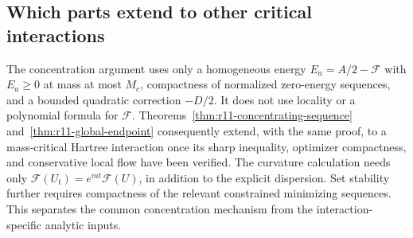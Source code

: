 \subsection{Which parts extend to other critical interactions}

The concentration argument uses only a homogeneous energy
$E_a=A/2-\mathcal F$ with $E_a\ge0$ at mass at most $M_c$,
compactness of normalized zero-energy sequences, and a bounded
quadratic correction $-D/2$.  It does not use locality or a polynomial
formula for $\mathcal F$.  Theorems~\ref{thm:r11-concentrating-sequence}
and~\ref{thm:r11-global-endpoint} consequently extend, with the same
proof, to a mass-critical Hartree interaction once its sharp inequality,
optimizer compactness, and conservative local flow have been verified.
The curvature calculation needs only
$\mathcal F(U_t)=e^{mt}\mathcal F(U)$, in addition to the explicit
dispersion.  Set stability further requires compactness of the relevant
constrained minimizing sequences.  This separates the common
concentration mechanism from the interaction-specific analytic inputs.
